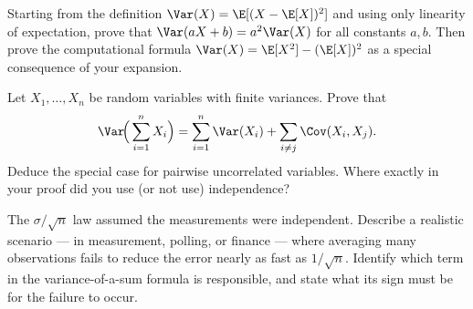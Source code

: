 \begin{exercise}
\label{ch09:exr-proof}
Starting from the definition $\Var(X) = \E[(X-\E[X])^2]$ and using only
linearity of expectation, prove that $\Var(aX+b) = a^2\Var(X)$ for all
constants $a,b$. Then prove the computational formula
$\Var(X) = \E[X^2]-(\E[X])^2$ as a special consequence of your expansion.
\end{exercise}

\begin{exercise}
\label{ch09:exr-proofsum}
Let $X_1,\dots,X_n$ be random variables with finite variances. Prove that
\[
  \Var\!\Big(\sum_{i=1}^n X_i\Big)
  = \sum_{i=1}^n \Var(X_i) + \sum_{i\ne j}\Cov(X_i,X_j).
\]
Deduce the special case for pairwise uncorrelated variables. Where exactly in
your proof did you use (or not use) independence?
\end{exercise}

\begin{exercise}
\label{ch09:exr-concept}
The $\sigma/\sqrt n$ law assumed the measurements were independent. Describe a
realistic scenario --- in measurement, polling, or finance --- where averaging
many observations fails to reduce the error nearly as fast as $1/\sqrt n$.
Identify which term in the variance-of-a-sum formula is responsible, and state
what its sign must be for the failure to occur.
\end{exercise}
